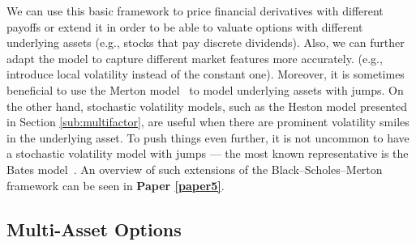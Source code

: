 \documentclass{UUThesisTemplate}
\begin{document}
\par
We can use this basic framework to price financial derivatives with different payoffs or extend it in order to be able to valuate options with different underlying assets (e.g., stocks that pay discrete dividends). Also, we can further adapt the model to capture different market features more accurately. (e.g., introduce local volatility instead of the constant one). Moreover, it is sometimes beneficial to use the Merton model~\cite{merton1976option} to model underlying assets with jumps. On the other hand, stochastic volatility models, such as the Heston model presented in Section \ref{sub:multifactor}, are useful when there are prominent volatility smiles in the underlying asset. To push things even further, it is not uncommon to have a stochastic volatility model with jumps --- the most known representative is the Bates model~\cite{bates1996jumps}. An overview of such extensions of the Black--Scholes--Merton framework can be seen in \textbf{Paper \ref{paper5}}.
%



%
\subsection{Multi-Asset Options}
\end{document}
